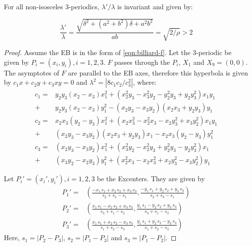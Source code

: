 \begin{theorem}
For all non-isosceles 3-periodics, $\lambda'/\lambda$ is invariant and given by:
\label{thm:focal-ratio}
\end{theorem}
 
\begin{equation}
 \frac{\lambda'}{\lambda}= \frac{\sqrt{\delta^2+\left(a^2+b^2\right)\delta+ a^2b^2}}{a b}=\sqrt{2/\rho}>2
 \label{eqn:focal-ratio}
\end{equation}

\begin{proof}
Assume the EB is in the form of \eqref{eqn:billiard-f}. Let the 3-periodic be given by $P_i=(x_i,y_i),i=1,2,3$. $F$ passes through the $P_i$, $X_1$ and $X_9=(0,0)$. The asymptotes of $F$ are parallel to the EB axes, therefore this hyperbola is given by $c_1x+c_2y+c_3 x y = 0$ and $\lambda^2=|8c_1c_2/c_3^2|$, where: 
\begin{align}
c_1=& y_2y_3(x_2-x_3)x_1^2+(x_2^2y_3-x_3^2y_2-y_2^2y_3
+y_2y_3^2)x_1y_1 \nonumber\\
+&y_2y_3(x_2-x_3)y_1^2  
-(x_2y_3-x_3y_2)(x_2x_3+y_2y_3)y_1
 \nonumber \\
 c_2=&x_2x_3(y_2-y_3)x_1^2+(x_2x_3^2-x_2^2x_3-x_2y_3^2+x_3y_2^2)x_1y_1 \label{eqn:ci} \\
 +&(x_2y_3-x_3y_2)(x_2x_3+y_2y_3)x_1-x_2x_3(y_2-y_3)y_1^2 \nonumber\\
 c_3=& (x_2y_3-x_3y_2)x_1^2+
(x_3^2y_2-x_2^2y_3+  y_2^2y_3-y_2y_3^2)x_1 \nonumber\\
+&(x_3y_2-x_2y_3 )y_1^2 
+(x_2^2x_3-x_2x_3^2+x_2y_3^2-x_3y_2^2)y_1 \nonumber
\end{align}
 
Let $P_i'=(x_i',y_i'),i=1,2,3$ be the Excenters. They are given by
\begin{align} 
    P_1'=&\left({\frac {-{x_1}\,{s_1}+{x_2}\,{s_2}+{x_3}\,{s_3}}{{
s_2}+{s_3}-{s_1}}},{\frac {-{y_1}\,{s_1}+{y_2}\,{
s_2}+{y_3}\,{s_3}}{{s_2}+{s_3}-{s_1}}}\right) \nonumber\\
P_2'=& \left({\frac {{x_1}\,{s_1}-{x_2}\,{s_2}+{x_3}\,{s_3}}{{
s_3}+{s_1}-{s_2}}},{\frac {{y_1}\,{s_1}-{y_2}\,{
s_2}+{y_3}\,{s_3}}{{s_3}+{s_1}-{s_2}}}\right) \label{eqn:pi-prime} \\
P_3'=& \left({\frac {{x_1}\,{s_1}+{x_2}\,{s_2}-{x_3}\,{s_3}}{{
s_1}+{s_2}-{s_3}}},{\frac {{y_1}\,{s_1}+{y_2}\,{
s_2}-{y_3}\,{s_3}}{{s_1}+{s_2}-{s_3}}}\right) \nonumber
\end{align}
Here, $s_1=|P_2-P_3|$, $s_2=|P_1-P_3|$ and $s_3=|P_1-P_2|$.


\end{proof}
